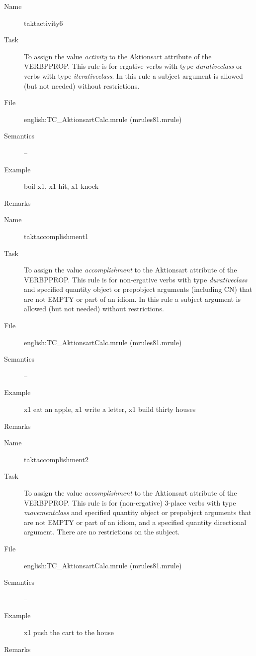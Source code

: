 \begin{description}
\vspace{1 cm}
\begin{description}
\item[Name] taktactivity6
\item[Task] To assign the value {\em activity\/} to the Aktionsart attribute of 
the VERBPPROP. This rule is for ergative verbs with type {\em durativeclass} or 
verbs with type {\em iterativeclass}.
In this rule a subject argument is allowed (but not needed) without 
restrictions.
\item[File] english:TC\_AktionsartCalc.mrule (mrules81.mrule)
\item[Semantics] --
\item[Example] boil x1, x1 hit, x1 knock
\item[Remarks]
\end{description}

\vspace{1 cm}
\begin{description}
\item[Name] taktaccomplishment1
\item[Task] To assign the value {\em accomplishment\/} to the Aktionsart 
attribute of the 
VERBPPROP. This rule is for non-ergative verbs with type {\em 
durativeclass\/} and specified quantity object or prepobject arguments 
(including CN) that are not EMPTY or part of an idiom.
In this rule a subject argument is allowed (but not needed) without
restrictions.
\item[File] english:TC\_AktionsartCalc.mrule (mrules81.mrule)
\item[Semantics] --
\item[Example] x1 eat an apple, x1 write a letter, x1 build thirty houses
\item[Remarks]
\end{description}

\vspace{1 cm}
\begin{description}
\item[Name] taktaccomplishment2
\item[Task] To assign the value {\em accomplishment\/} to the Aktionsart 
attribute of the 
VERBPPROP. This rule is for (non-ergative) 3-place verbs with type {\em 
movementclass\/} and specified quantity object or prepobject arguments that 
are not EMPTY or part of an idiom, and a specified quantity directional 
argument.
There are no restrictions on the subject.
\item[File] english:TC\_AktionsartCalc.mrule (mrules81.mrule)
\item[Semantics] --
\item[Example] x1 push the cart to the house
\item[Remarks]
\end{description}


\end{description}
